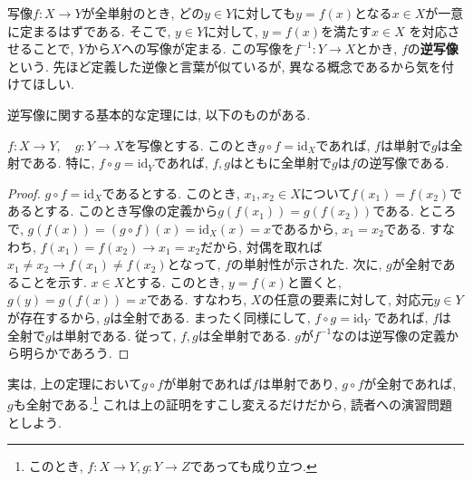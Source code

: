 \documentclass[a4j,dvipdfmx]{jsarticle}
\numberwithin{equation}{section}
\begin{document}
            写像$f:X\rightarrow Y$が全単射のとき, どの$y\in Y$に対しても$y=f(x)$となる$x\in X$が一意に定まるはずである. そこで, $y\in Y$に対して, $y=f(x)$を満たす$x\in X$
            を対応させることで, $Y$から$X$への写像が定まる. この写像を$f^{-1}:Y\rightarrow X$とかき, $f$の\textbf{逆写像}という. 先ほど定義した逆像と言葉が似ているが, 異なる概念であるから気を付けてほしい.

            逆写像に関する基本的な定理には, 以下のものがある.
            \begin{screen}
                $f:X\rightarrow Y,\quad g:Y\rightarrow X$を写像とする. このとき$g\circ f = \mathrm{id}_X$であれば, $f$は単射で$g$は全射である.
                特に, $f\circ g = \mathrm{id}_Y$であれば, $f,g$はともに全単射で$g$は$f$の逆写像である.
            \end{screen}
            \begin{proof}
                $g\circ f=\mathrm{id}_X$であるとする. このとき, $x_1,x_2\in X$について$f(x_1)=f(x_2)$であるとする. このとき写像の定義から$g(f(x_1))=g(f(x_2))$である. 
                ところで, $g(f(x))=(g\circ f)(x)=\mathrm{id}_X(x)=x$であるから, $x_1=x_2$である. すなわち, $f(x_1)=f(x_2)\rightarrow x_1=x_2$だから, 対偶を取れば
                $x_1\neq x_2\rightarrow f(x_1)\neq f(x_2)$となって, $f$の単射性が示された. 次に, $g$が全射であることを示す. $x\in X$とする. このとき, $y=f(x)$と置くと, 
                $g(y)=g(f(x))=x$である. すなわち, $X$の任意の要素に対して, 対応元$y\in Y$が存在するから, $g$は全射である. まったく同様にして, $f\circ g= \mathrm{id}_Y$
                であれば, $f$は全射で$g$は単射である. 従って, $f,g$は全単射である. $g$が$f^{-1}$なのは逆写像の定義から明らかであろう.
            \end{proof}
            実は, 上の定理において$g\circ f$が単射であれば$f$は単射であり, $g\circ f$が全射であれば, $g$も全射である.\footnote{このとき, $f:X\rightarrow Y,g:Y\rightarrow Z$であっても成り立つ.} これは上の証明をすこし変えるだけだから, 読者への演習問題としよう.\\
\end{document}
